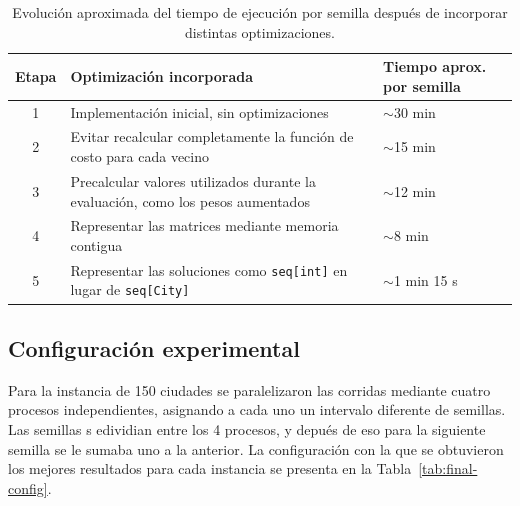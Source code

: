 \documentclass[twoside,11pt]{article}
\begin{document}
\begin{table}[H]
\centering

\footnotesize
\renewcommand{\arraystretch}{1.15}
\setlength{\tabcolsep}{4pt}

\begin{tabularx}{\linewidth}{
    |c|
    X|
    >{\centering\arraybackslash}p{2.5cm}|
}
\hline

\textbf{Etapa} &
\textbf{Optimización incorporada} &
\textbf{Tiempo aprox. por semilla} \\ \hline

1
& Implementación inicial, sin optimizaciones
& $\sim$30 min \\ \hline

2
& Evitar recalcular completamente la función de costo para cada vecino
& $\sim$15 min \\ \hline

3
& Precalcular valores utilizados durante la evaluación, como los pesos aumentados
& $\sim$12 min \\ \hline

4
& Representar las matrices mediante memoria contigua
& $\sim$8 min \\ \hline

5
& Representar las soluciones como \texttt{seq[int]} en lugar de
\texttt{seq[City]}
& $\sim$1 min 15 s \\ \hline

\end{tabularx}

\caption{Evolución aproximada del tiempo de ejecución por semilla después de
incorporar distintas optimizaciones.}
\label{tab:optimization-times}
\end{table}


\subsection{Configuración experimental}

Para la instancia de 150 ciudades se paralelizaron las
corridas mediante cuatro procesos independientes, asignando a cada uno un intervalo diferente de semillas. Las semillas s edividian entre los 4 procesos, y depués de eso para la siguiente semilla se le sumaba uno a la anterior. La configuración con la que se obtuvieron los mejores resultados para cada instancia se presenta en la Tabla~\ref{tab:final-config}.
\end{document}
